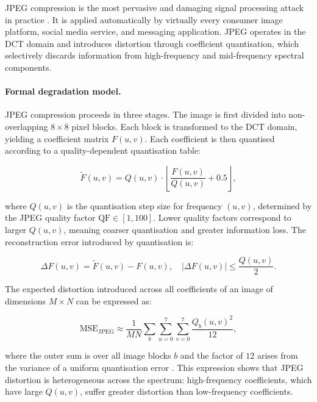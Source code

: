 \documentclass[12pt,a4paper,oneside]{report}
\begin{document}
	JPEG compression is the most pervasive and damaging signal processing attack in practice
	\cite{wallace1992jpeg}. It is applied automatically by virtually every consumer image platform,
	social media service, and messaging application. JPEG operates in the DCT domain and introduces
	distortion through coefficient quantisation, which selectively discards information from
	high-frequency and mid-frequency spectral components.
	
	\paragraph{Formal degradation model.}
	JPEG compression proceeds in three stages. The image is first divided into non-overlapping
	$8 \times 8$ pixel blocks. Each block is transformed to the DCT domain, yielding a coefficient
	matrix $F(u,v)$. Each coefficient is then quantised according to a quality-dependent quantisation
	table:
	
	\begin{equation}
		\tilde{F}(u,v) = Q(u,v) \cdot \left\lfloor
		\frac{F(u,v)}{Q(u,v)} + 0.5
		\right\rfloor,
		\label{eq:jpeg_quant}
	\end{equation}
	
	where $Q(u,v)$ is the quantisation step size for frequency $(u,v)$, determined by the JPEG
	quality factor $\text{QF} \in [1, 100]$. Lower quality factors correspond to larger $Q(u,v)$,
	meaning coarser quantisation and greater information loss. The reconstruction error introduced
	by quantisation is:
	
	\begin{equation}
		\Delta F(u,v) = \tilde{F}(u,v) - F(u,v), \quad
		|\Delta F(u,v)| \leq \frac{Q(u,v)}{2}.
		\label{eq:jpeg_error}
	\end{equation}
	
	The expected distortion introduced across all coefficients of an image of dimensions $M \times N$
	can be expressed as:
	
	\begin{equation}
		\mathrm{MSE}_\text{JPEG} \approx \frac{1}{MN} \sum_{b} \sum_{u=0}^{7} \sum_{v=0}^{7}
		\frac{Q_b(u,v)^2}{12},
		\label{eq:jpeg_mse}
	\end{equation}
	
	where the outer sum is over all image blocks $b$ and the factor of $12$ arises from the
	variance of a uniform quantisation error \cite{gonzalez2008digital}. This expression shows
	that JPEG distortion is heterogeneous across the spectrum: high-frequency coefficients, which
	have large $Q(u,v)$, suffer greater distortion than low-frequency coefficients.
	
\end{document}
